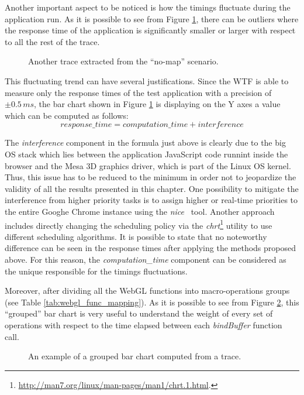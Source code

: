 Another important aspect to be noticed is how the timings fluctuate during the
application run. As it is possible to see from Figure \ref{img:no_map_example},
there can be outliers where the response time of the application is significantly
smaller or larger with respect to all the rest of the trace.
\begin{figure}[!htb]
    \caption{Another trace extracted from the ``no-map'' scenario.}
    \label{img:no_map_example}
\end{figure}
This fluctuating trend can have several justifications. Since the WTF is able to
measure only the response times of the test application with a precision of
\(\pm 0.5\,ms\), the bar chart shown
in Figure \ref{img:no_map_example} is displaying on the Y axes a value which can
be computed as follows:
\begin{equation*}
    response\_time = computation\_time + interference
\end{equation*}

The \emph{interference} component in the formula just above is clearly due to the
big OS stack which lies between the application JavaScript code runnint inside the
browser and the Mesa 3D graphics driver, which is part of the Linux OS kernel.
Thus, this issue has to be reduced to the minimum in order not to jeopardize the
validity of all the results presented in this chapter. One possibility to mitigate
the interference from higher priority tasks is to assign higher or real-time priorities
to the entire Googhe Chrome instance using the \emph{nice}~\cite{aas2005understanding}
tool. Another approach includes directly changing the scheduling policy via the
\emph{chrt}\footnote{\url{http://man7.org/linux/man-pages/man1/chrt.1.html}.}
utility to use different scheduling algorithms. It is possible to state that no
noteworthy difference can be seen in the response times after applying the
methods proposed above. For this reason, the \emph{computation\_time} component
can be considered as the unique responsible for the timings fluctuations.

Moreover, after dividing all the WebGL functions into macro-operations groups
(see Table \ref{tab:webgl_func_mapping}). As it is possible to see from Figure
\ref{img:no_map_groups}, this ``grouped'' bar chart is very useful to understand
the weight of every set of operations with respect to the time elapsed between
each \emph{bindBuffer} function call.
\begin{figure}[!htb]
    \caption{An example of a grouped bar chart computed from a trace.}
    \label{img:no_map_groups}
\end{figure}

